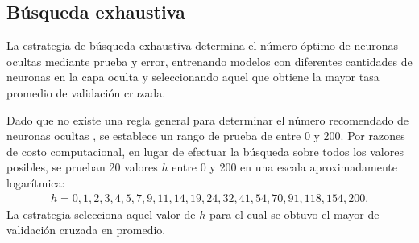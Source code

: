 %
\subsection{Búsqueda exhaustiva}
%
La estrategia de búsqueda exhaustiva determina el número óptimo
de neuronas ocultas mediante prueba y error, entrenando
modelos con diferentes cantidades de neuronas en la capa oculta
y seleccionando aquel que obtiene la mayor tasa \GM promedio de
validación cruzada.

Dado que no existe una regla general para determinar el número
recomendado de neuronas ocultas \cite{nnfaq3}, se establece un
rango de prueba de entre 0 y 200.
Por razones de costo computacional, en lugar de efectuar la búsqueda
sobre todos los valores posibles, se prueban 20 valores $h$ entre 0 y
200 en una escala aproximadamente logarítmica:
%
\begin{align}
  \label{mlp-hidden-tries}
  h=0,1,2,3,4,5,7,9,11,14,19,24,32,41,54,70,91,118,154,200.
\end{align}
%
La estrategia selecciona aquel valor de $h$ para el cual se obtuvo
el mayor \GM de validación cruzada en promedio.
